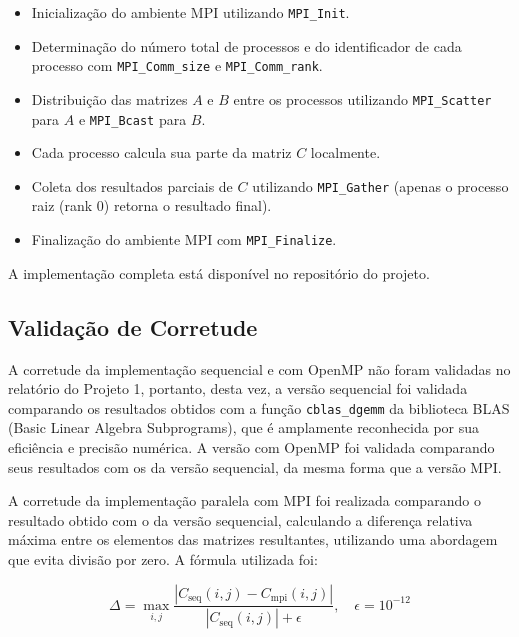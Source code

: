 \documentclass[12pt, a4paper]{article}
\begin{document}
    \begin{itemize}
        \item Inicialização do ambiente MPI utilizando \texttt{MPI\_Init}.
        \item Determinação do número total de processos e do identificador de cada processo com \texttt{MPI\_Comm\_size} e \texttt{MPI\_Comm\_rank}.
        \item Distribuição das matrizes $A$ e $B$ entre os processos utilizando \texttt{MPI\_Scatter} para $A$ e \texttt{MPI\_Bcast} para $B$.
        \item Cada processo calcula sua parte da matriz $C$ localmente.
        \item Coleta dos resultados parciais de $C$ utilizando \texttt{MPI\_Gather} (apenas o processo raiz (rank 0) retorna o resultado final).
        \item Finalização do ambiente MPI com \texttt{MPI\_Finalize}.
    \end{itemize}

    A implementação completa está disponível no repositório do projeto.\footnotemark[1]


    \subsection{Validação de Corretude}

    A corretude da implementação sequencial e com OpenMP não foram validadas no relatório do Projeto 1, portanto, desta vez, a versão sequencial foi validada comparando os resultados obtidos com a função \texttt{cblas\_dgemm} da biblioteca BLAS (Basic Linear Algebra Subprograms), que é amplamente reconhecida por sua eficiência e precisão numérica. A versão com OpenMP foi validada comparando seus resultados com os da versão sequencial, da mesma forma que a versão MPI.\@

    A corretude da implementação paralela com MPI foi realizada comparando o resultado obtido com o da versão sequencial, calculando a diferença relativa máxima entre os elementos das matrizes resultantes, utilizando uma abordagem que evita divisão por zero. A fórmula utilizada foi:

    \[
        \Delta = \max_{i,j} \frac{|C_{\text{seq}}(i, j) - C_{\text{mpi}}(i, j)|}{|C_{\text{seq}}(i, j)| + \epsilon}, \quad \epsilon = 10^{-12}
    \]
\end{document}
